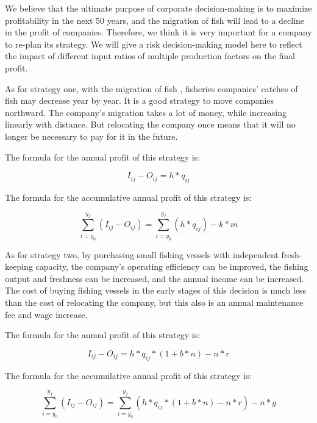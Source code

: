 \documentclass{mcmthesis}
\numberwithin{figure}{section}
\numberwithin{table}{section}
\begin{document}

We believe that the ultimate purpose of corporate decision-making is to maximize profitability in the next 50 years, and the migration of fish will lead to a decline in the profit of companies. Therefore, we think it is very important for a company to re-plan its strategy. We will give a risk decision-making model here to reflect the impact of different input ratios of multiple production factors on the final profit.

As for strategy one, with the migration of fish , fisheries companies' catches of fish may decrease year by year. It is a good strategy to move companies northward. The company's migration takes a lot of money, while increasing linearly with distance. But relocating the company once means that it will no longer be necessary to pay for it in the future.

The formula for the annual profit of this strategy is:

\begin{equation}\label{1}
  I_{ij} - O_{ij} = h * q_{ij}
  \end{equation}

The formula for the accumulative annual profit of this strategy is:

\begin{equation}\label{2}
  \sum_{i=y_0}^{y_f} (I_{ij} - O_{ij}) = \sum_{i=y_0}^{y_f} (h * q_{ij}) - k*m
  \end{equation}
  
As for strategy two, by purchasing small fishing vessels with independent fresh-keeping capacity, the company's operating efficiency can be improved, the fishing output and freshness can be increased, and the annual income can be increased. The cost of buying fishing vessels in the early stages of this decision is much less than the cost of relocating the company, but this also is an annual maintenance fee and wage increase.

The formula for the annual profit of this strategy is:

\begin{equation}\label{3}
  I_{ij} - O_{ij} = h * q_{ij} * (1+b*n) - n*r
  \end{equation}

The formula for the accumulative annual profit of this strategy is:

\begin{equation}\label{4}
  \sum_{i=y_0}^{y_f} (I_{ij} - O_{ij}) = \sum_{i=y_0}^{y_f} (h * q_{ij}* (1+b*n) - n * r ) - n * g
\end{equation}
  
\end{document}
